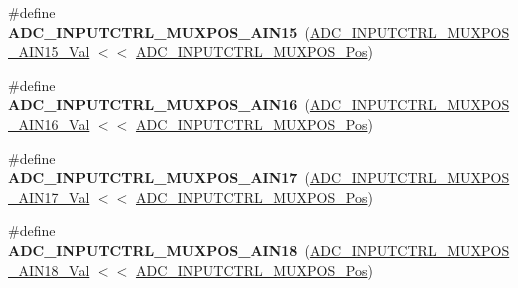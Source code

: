 \begin{DoxyCompactItemize}
\item 
\hypertarget{group___s_a_m_l21___a_d_c_ga8c223fb46671c9447a44aaac8562f3ad}{}\#define {\bfseries A\+D\+C\+\_\+\+I\+N\+P\+U\+T\+C\+T\+R\+L\+\_\+\+M\+U\+X\+P\+O\+S\+\_\+\+A\+I\+N15}~(\hyperlink{group___s_a_m_l21___a_d_c_ga59027c13e656f2325c09c8f21a6abfd7}{A\+D\+C\+\_\+\+I\+N\+P\+U\+T\+C\+T\+R\+L\+\_\+\+M\+U\+X\+P\+O\+S\+\_\+\+A\+I\+N15\+\_\+\+Val} $<$$<$ \hyperlink{group___s_a_m_l21___a_d_c_ga583868be285e1c06c9a93dfd552d8c6a}{A\+D\+C\+\_\+\+I\+N\+P\+U\+T\+C\+T\+R\+L\+\_\+\+M\+U\+X\+P\+O\+S\+\_\+\+Pos})\label{group___s_a_m_l21___a_d_c_ga8c223fb46671c9447a44aaac8562f3ad}

\item 
\hypertarget{group___s_a_m_l21___a_d_c_gad3fe69aceae3807286504a2f35f19315}{}\#define {\bfseries A\+D\+C\+\_\+\+I\+N\+P\+U\+T\+C\+T\+R\+L\+\_\+\+M\+U\+X\+P\+O\+S\+\_\+\+A\+I\+N16}~(\hyperlink{group___s_a_m_l21___a_d_c_ga34709dc7786fc55236c1b307ea2fe5fe}{A\+D\+C\+\_\+\+I\+N\+P\+U\+T\+C\+T\+R\+L\+\_\+\+M\+U\+X\+P\+O\+S\+\_\+\+A\+I\+N16\+\_\+\+Val} $<$$<$ \hyperlink{group___s_a_m_l21___a_d_c_ga583868be285e1c06c9a93dfd552d8c6a}{A\+D\+C\+\_\+\+I\+N\+P\+U\+T\+C\+T\+R\+L\+\_\+\+M\+U\+X\+P\+O\+S\+\_\+\+Pos})\label{group___s_a_m_l21___a_d_c_gad3fe69aceae3807286504a2f35f19315}

\item 
\hypertarget{group___s_a_m_l21___a_d_c_ga04c110fada323cb4db007095662b515b}{}\#define {\bfseries A\+D\+C\+\_\+\+I\+N\+P\+U\+T\+C\+T\+R\+L\+\_\+\+M\+U\+X\+P\+O\+S\+\_\+\+A\+I\+N17}~(\hyperlink{group___s_a_m_l21___a_d_c_gab025b09d10197f292b71759e1921c271}{A\+D\+C\+\_\+\+I\+N\+P\+U\+T\+C\+T\+R\+L\+\_\+\+M\+U\+X\+P\+O\+S\+\_\+\+A\+I\+N17\+\_\+\+Val} $<$$<$ \hyperlink{group___s_a_m_l21___a_d_c_ga583868be285e1c06c9a93dfd552d8c6a}{A\+D\+C\+\_\+\+I\+N\+P\+U\+T\+C\+T\+R\+L\+\_\+\+M\+U\+X\+P\+O\+S\+\_\+\+Pos})\label{group___s_a_m_l21___a_d_c_ga04c110fada323cb4db007095662b515b}

\item 
\hypertarget{group___s_a_m_l21___a_d_c_gabeb9f6a07226988851e2886cd3922caa}{}\#define {\bfseries A\+D\+C\+\_\+\+I\+N\+P\+U\+T\+C\+T\+R\+L\+\_\+\+M\+U\+X\+P\+O\+S\+\_\+\+A\+I\+N18}~(\hyperlink{group___s_a_m_l21___a_d_c_ga72f8781f2eadc5d8d9f844bfae90b8b9}{A\+D\+C\+\_\+\+I\+N\+P\+U\+T\+C\+T\+R\+L\+\_\+\+M\+U\+X\+P\+O\+S\+\_\+\+A\+I\+N18\+\_\+\+Val} $<$$<$ \hyperlink{group___s_a_m_l21___a_d_c_ga583868be285e1c06c9a93dfd552d8c6a}{A\+D\+C\+\_\+\+I\+N\+P\+U\+T\+C\+T\+R\+L\+\_\+\+M\+U\+X\+P\+O\+S\+\_\+\+Pos})\label{group___s_a_m_l21___a_d_c_gabeb9f6a07226988851e2886cd3922caa}


\end{DoxyCompactItemize}

